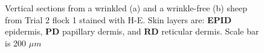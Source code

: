 %

\begin{figure}[!h]
\centering
\captionsetup{width=0.7\textwidth}
  \caption{Vertical sections from a wrinkled (a) and a wrinkle-free (b)  sheep from Trial 2 flock 1 stained with H-E. Skin layers are: {\bf EPID} epidermis, {\bf PD} papillary dermis, and {\bf RD} reticular dermis. Scale bar is 200 $\mu m$ }
\vfill
  \label{fig:trial24xhe}
\end{figure}

%

